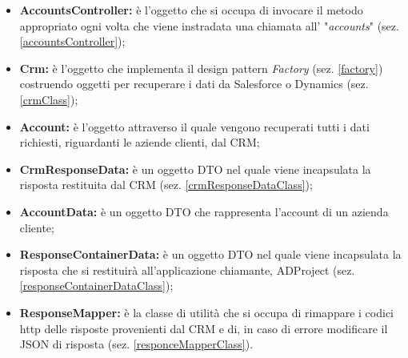 \begin{itemize}
	\item \textbf{AccountsController:} è l'oggetto che si occupa di invocare il metodo appropriato ogni volta che viene instradata una chiamata all' "\textit{accounts}" (sez. \ref{accountsController});  
	\item \textbf{Crm:} è l'oggetto che implementa il design pattern \textit{Factory} (sez. \ref{factory}) costruendo oggetti per recuperare i dati da Salesforce o Dynamics (sez. \ref{crmClass});
	\item \textbf{Account:} è l'oggetto attraverso il quale vengono recuperati tutti i dati richiesti, riguardanti le aziende clienti, dal CRM;
	\item \textbf{CrmResponseData:} è un oggetto DTO nel quale viene incapsulata la risposta  restituita dal CRM (sez. \ref{crmResponseDataClass});
	\item \textbf{AccountData:} è un oggetto DTO che rappresenta l'account di un azienda cliente;
	\item \textbf{ResponseContainerData:}
	è un oggetto DTO nel quale viene incapsulata la risposta  che si restituirà all'applicazione chiamante, ADProject (sez. \ref{responseContainerDataClass});
	\item \textbf{ResponseMapper:} è la classe di utilità che si occupa di rimappare i codici http delle risposte provenienti dal CRM e di, in caso di errore modificare il JSON di risposta (sez. \ref{responceMapperClass}).

\end{itemize}